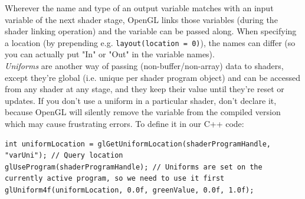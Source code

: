 \documentclass[table, xcdraw]{article}%
\begin{document}
Wherever the name and type of an output variable matches with an input variable of the next shader stage, OpenGL links those variables (during the shader linking operation) and the variable can be passed along. When specifying a location (by prepending e.g. \texttt{layout(location = 0)}), the names can differ (so you can actually put "In" or "Out" in the variable names).\\
\emph{Uniforms} are another way of passing (non-buffer/non-array) data to shaders, except they're global (i.e. unique per shader program object) and can be accessed from any shader at any stage, and they keep their value until they're reset or updates. If you don't use a uniform in a particular shader, don't declare it, because OpenGL will silently remove the variable from the compiled version which may cause frustrating errors. To define it in our C++ code:

\begin{verbatim}
int uniformLocation = glGetUniformLocation(shaderProgramHandle, "varUni"); // Query location
glUseProgram(shaderProgramHandle); // Uniforms are set on the currently active program, so we need to use it first
glUniform4f(uniformLocation, 0.0f, greenValue, 0.0f, 1.0f);
\end{verbatim}
\end{document}
